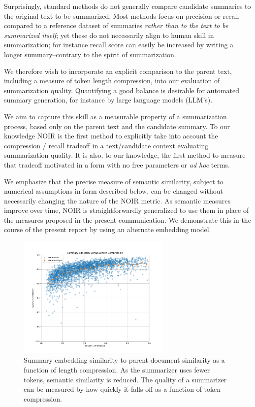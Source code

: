 \documentclass{article}
\begin{document}
Surprisingly, standard methods do not generally compare candidate summaries to the original text to be summarized.
Most methods focus on precision or recall compared to a reference dataset of summaries \textit{rather than to the text to be summarized itself}; yet these do not necessarily align to human skill in summarization; for instance recall score can easily be increased by writing a longer summary--contrary to the spirit of summarization.  

We therefore wish to incorporate an explicit comparison to the parent text, including a measure of token length compression, into our evaluation of summarization quality.
Quantifying a good balance is desirable for automated summary generation, for instance by large language models (LLM's).

We aim to capture this skill as a measurable property of a summarization process, based only on the parent text and the candidate summary.
To our knowledge NOIR is the first method to explicitly take into account the compression / recall tradeoff in a text/candidate context evaluating summarization quality.
It is also, to our knowledge, the first method to measure that tradeoff motivated in a form with no free parameters or \textit{ad hoc} terms.

We emphasize that the precise measure of semantic similarity, subject to numerical assumptions in form described below, can be changed without necessarily changing the nature of the NOIR metric.
As semantic measures improve over time, NOIR is straightforwardly generalized to use them in place of the measures proposed in the present communication.
We demonstrate this in the course of the present report by using an alternate embedding model.

\begin{figure}
	\centering
	\includegraphics[height=6cm]{Summary_Similarity_versus_Length_Compression.png}
	\caption{Summary embedding similarity to parent document similarity as a function of length compression.  As the summarizer uses fewer tokens, semantic similarity is reduced.  The quality of a summarizer can be measured by how quickly it falls off as a function of token compression.}
	\label{fig:similarityvslength}
\end{figure}
\end{document}
